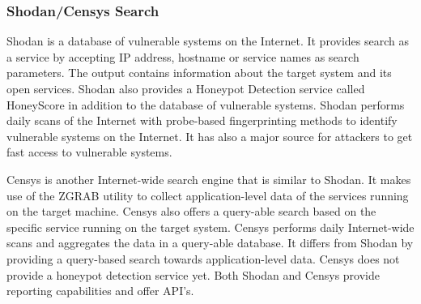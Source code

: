 \subsubsection{Shodan/Censys Search}
Shodan is a database of vulnerable systems on the Internet. It provides search as a service by accepting IP address, hostname or service names as search parameters. The output contains information about the target system and its open services. Shodan also provides a Honeypot Detection service called HoneyScore \cite{SHODAN} in addition to the database of vulnerable systems. Shodan performs daily scans of the Internet with probe-based fingerprinting methods to identify vulnerable systems on the Internet. It has also a major source for attackers to get fast access to vulnerable systems.

Censys is another Internet-wide search engine that is similar to Shodan. It makes use of the ZGRAB utility to collect application-level data of the services running on the target machine. Censys also offers a query-able search based on the specific service running on the target system. Censys performs daily Internet-wide scans and aggregates the data in a query-able database. It differs from Shodan by providing a query-based search towards application-level data. Censys does not provide a honeypot detection service yet. Both Shodan and Censys provide reporting capabilities and offer API's. 


